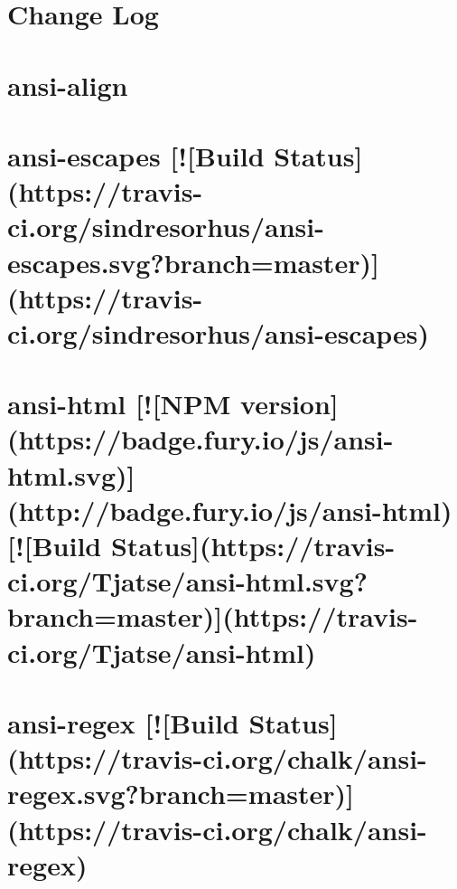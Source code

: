 \documentclass[twoside]{book}
\newcommand{\+}{\discretionary{\mbox{\scriptsize$\hookleftarrow$}}{}{}}
\begin{document}
\chapter{Change Log}
\label{md__c_1_workspace_demo_src_main_script_node_modules_ansi-align__c_h_a_n_g_e_l_o_g}

\chapter{ansi-\/align}
\label{md__c_1_workspace_demo_src_main_script_node_modules_ansi-align__r_e_a_d_m_e}

\chapter{ansi-\/escapes \mbox{[}!\mbox{[}Build Status\mbox{]}(https\+://travis-\/ci.org/sindresorhus/ansi-\/escapes.svg?branch=master)\mbox{]}(https\+://travis-\/ci.org/sindresorhus/ansi-\/escapes)}
\label{md__c_1_workspace_demo_src_main_script_node_modules_ansi-escapes_readme}

\chapter{ansi-\/html \mbox{[}!\mbox{[}N\+PM version\mbox{]}(https\+://badge.fury.\+io/js/ansi-\/html.svg)\mbox{]}(http\+://badge.fury.\+io/js/ansi-\/html) \mbox{[}!\mbox{[}Build Status\mbox{]}(https\+://travis-\/ci.org/\+Tjatse/ansi-\/html.svg?branch=master)\mbox{]}(https\+://travis-\/ci.org/\+Tjatse/ansi-\/html)}
\label{md__c_1_workspace_demo_src_main_script_node_modules_ansi-html__r_e_a_d_m_e}

\chapter{ansi-\/regex \mbox{[}!\mbox{[}Build Status\mbox{]}(https\+://travis-\/ci.org/chalk/ansi-\/regex.svg?branch=master)\mbox{]}(https\+://travis-\/ci.org/chalk/ansi-\/regex)}
\label{md__c_1_workspace_demo_src_main_script_node_modules_ansi-regex_readme}

\end{document}
